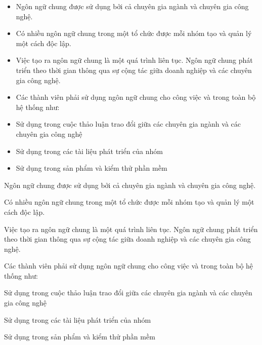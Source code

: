 \begin{itemize} 



    \item Ngôn ngữ chung được sử dụng bởi cả chuyên gia ngành và chuyên gia công nghệ.
    
    \item Có nhiều ngôn ngữ chung trong một tổ chức được mỗi nhóm tạo và quản lý một cách độc lập.
    
    \item Việc tạo ra ngôn ngữ chung là một quá trình liên tục. Ngôn ngữ chung phát triển theo thời gian thông qua sự cộng tác giữa doanh nghiệp và các chuyên gia công nghệ.
    
    \item Các thành viên phải sử dụng ngôn ngữ chung cho công việc và trong toàn bộ hệ thống như:
    
    \item Sử dụng trong cuộc thảo luận trao đổi giữa các chuyên gia ngành và các chuyên gia công nghệ
    
    \item Sử dụng trong các tài liệu phát triển của nhóm
    
    \item Sử dụng trong sản phẩm và kiểm thử phần mềm
    
     \end{itemize} 
    
    


 

Ngôn ngữ chung được sử dụng bởi cả chuyên gia ngành và chuyên gia công nghệ.

Có nhiều ngôn ngữ chung trong một tổ chức được mỗi nhóm tạo và quản lý một cách độc lập.

Việc tạo ra ngôn ngữ chung là một quá trình liên tục. Ngôn ngữ chung phát triển theo thời gian thông qua sự cộng tác giữa doanh nghiệp và các chuyên gia công nghệ.

Các thành viên phải sử dụng ngôn ngữ chung cho công việc và trong toàn bộ hệ thống như:

Sử dụng trong cuộc thảo luận trao đổi giữa các chuyên gia ngành và các chuyên gia công nghệ

Sử dụng trong các tài liệu phát triển của nhóm

Sử dụng trong sản phẩm và kiểm thử phần mềm


